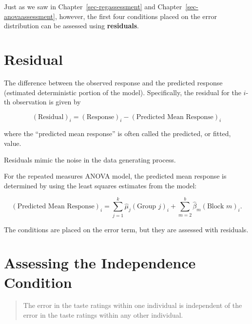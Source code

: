 \documentclass[
  letterpaper,
  DIV=11,
  numbers=noendperiod]{scrreprt}
\theoremstyle{plain}
\theoremstyle{definition}
\theoremstyle{definition}
\theoremstyle{remark}
\begin{document}
Just as we saw in Chapter~\ref{sec-regassessment} and
Chapter~\ref{sec-anovaassessment}, however, the first four conditions
placed on the error distribution can be assessed using
\textbf{residuals}.

\section{Residual}\label{residual-2}

The difference between the observed response and the predicted response
(estimated deterministic portion of the model). Specifically, the
residual for the \(i\)-th observation is given by

\[(\text{Residual})_i = (\text{Response})_i - (\text{Predicted Mean Response})_i\]

where the ``predicted mean response'' is often called the predicted, or
fitted, value.

Residuals mimic the noise in the data generating process.

For the repeated measures ANOVA model, the predicted mean response is
determined by using the least squares estimates from the model:

\[(\text{Predicted Mean Response})_i = \sum_{j=1}^{k} \widehat{\mu}_j (\text{Group } j)_i + \sum_{m=2}^{b} \widehat{\beta}_m (\text{Block } m)_i.\]

\begin{tcolorbox}[enhanced jigsaw, breakable, titlerule=0mm, colframe=quarto-callout-tip-color-frame, bottomtitle=1mm, opacityback=0, rightrule=.15mm, toptitle=1mm, arc=.35mm, bottomrule=.15mm, left=2mm, title=\textcolor{quarto-callout-tip-color}{\faLightbulb}\hspace{0.5em}{Big Idea}, leftrule=.75mm, coltitle=black, toprule=.15mm, colbacktitle=quarto-callout-tip-color!10!white, colback=white, opacitybacktitle=0.6]

The conditions are placed on the error term, but they are assessed with
residuals.

\end{tcolorbox}

\section{Assessing the Independence
Condition}\label{assessing-the-independence-condition-2}

\begin{quote}
The error in the taste ratings within one individual is independent of
the error in the taste ratings within any other individual.
\end{quote}
\end{document}
